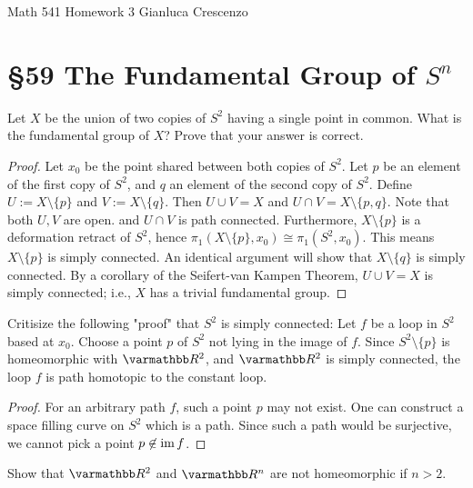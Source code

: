 \documentclass[10pt,oneside,openany]{memoir}
\begin{document}
\homeworktitle
{Math 541} %
{Homework 3} %
{Gianluca Crescenzo} %

\section*{\S 59 The Fundamental Group of $S^n$}
\begin{exercise}
	Let $X$ be the union of two copies of $S^2$ having a single point in common. What is the fundamental group of $X$? Prove that your answer is correct.
\end{exercise}
	\begin{proof}
		Let $x_0$ be the point shared between both copies of $S^2$. Let $p$ be an element of the first copy of $S^2$, and $q$ an element of the second copy of $S^2$. Define $U := X \setminus \{p\}$ and $V := X \setminus \{q\}$. Then $U \cup V = X$ and $U \cap V = X \setminus \{p,q\}$. Note that both $U,V$ are open. and $ U \cap V$ is path connected. Furthermore, $X \setminus \{p\}$ is a deformation retract of $S^2$, hence $\pi_1(X \setminus \{p\},x_0) \cong \pi_1(S^2,x_0)$. This means $X \setminus \{p\}$ is simply connected. An identical argument will show that $X \setminus \{q\}$ is simply connected. By a corollary of the Seifert-van Kampen Theorem, $U \cup V = X$ is simply connected; i.e., $X$ has a trivial fundamental group.
	\end{proof}
\begin{exercise}
	Critisize the following "proof" that $S^2$ is simply connected: Let $f$ be a loop in $S^2$ based at $x_0$. Choose a point $p$ of $S^2$ not lying in the image of $f$. Since $S^2 \setminus \{p\}$ is homeomorphic with $\bfR^2$, and $\bfR^2$ is simply connected, the loop $f$ is path homotopic to the constant loop.
\end{exercise}
	\begin{proof}
		For an arbitrary path $f$, such a point $p$ may not exist. One can construct a space filling curve on $S^2$ which is a path. Since such a path would be surjective, we cannot pick a point $p \not\in \operatorname{im} f$.
	\end{proof}
\begin{exercise}
	Show that $\bfR^2$ and $\bfR^n$ are not homeomorphic if $n > 2$. 
\end{exercise}
\end{document}
